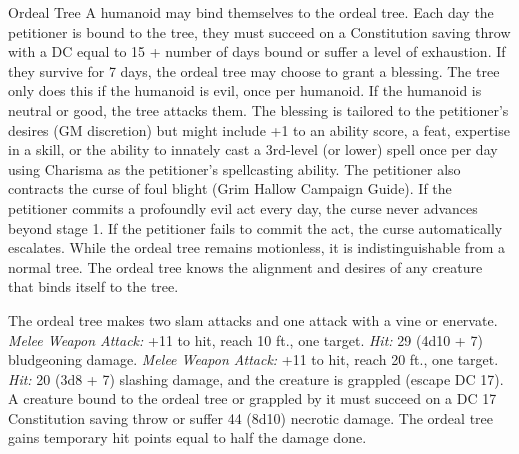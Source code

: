 \documentclass[10pt,a4paper,twoside,twocolumn,openany,bg=print,nodeprecatedcode]{dndbook}
\begin{document}
\begin{DndMonster}[float*=t]{Ordeal Tree}
\DndMonsterBasics[
armor-class = {17 (natural armor)},
hit-points = {\DndDice{12d20 + 60}},
speed = {20 ft.}
]
\DndMonsterAbilityScores[
 str = 24,
 dex = 7,
 con = 21,
 int = 12,
 wis = 16,
 cha = 12
]
\DndMonsterDetails[
damage-vulnerabilities = {fire},
damage-resistances = {bludgeoning, piercing},
languages = {Sylvan},
challenge = 12,
]
A humanoid may bind themselves to the ordeal tree. Each day the petitioner is bound to the tree, they must succeed on a Constitution saving throw with a DC equal to 15 + number of days bound or suffer a level of exhaustion. If they survive for 7 days, the ordeal tree may choose to grant a blessing. The tree only does this if the humanoid is evil, once per humanoid. If the humanoid is neutral or good, the tree attacks them.
The blessing is tailored to the petitioner's desires (GM discretion) but might include +1 to an ability score, a feat, expertise in a skill, or the ability to innately cast a 3rd-level (or lower) spell once per day using Charisma as the petitioner's spellcasting ability.
The petitioner also contracts the curse of foul blight (Grim Hallow Campaign Guide). If the petitioner commits a profoundly evil act every day, the curse never advances beyond stage 1. If the petitioner fails to commit the act, the curse automatically escalates.
While the ordeal tree remains motionless, it is indistinguishable from a normal tree.
The ordeal tree knows the alignment and desires of any creature that binds itself to the tree.
\par
{}
The ordeal tree makes two slam attacks and one attack with a vine or enervate.
\textsl{Melee Weapon Attack:} +11 to hit, reach 10 ft., one target. \textsl{Hit:} 29 (4d10 + 7) bludgeoning damage.
\textsl{Melee Weapon Attack:} +11 to hit, reach 20 ft., one target. \textsl{Hit:} 20 (3d8 + 7) slashing damage, and the creature is grappled (escape DC 17).
A creature bound to the ordeal tree or grappled by it must succeed on a DC 17 Constitution saving throw or suffer 44 (8d10) necrotic damage. The ordeal tree gains temporary hit points equal to half the damage done.
\end{DndMonster}
\end{document}
